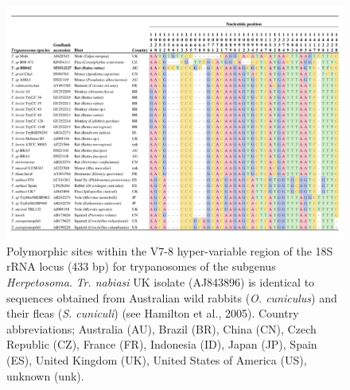 \documentclass[a4paper, nobind]{templates/ociamthesis}
\begin{document}
\begin{figure}
\includegraphics[width=0.95\linewidth]{figures/ms-figs/Ch5-Fig2} \caption[Nucleotide alignment of \textit{Trypanosoma lewisi} clade.]{Polymorphic sites within the V7-8 hyper-variable region of the 18S rRNA locus (433 bp) for trypanosomes of the subgenus \textit{Herpetosoma}. \textit{Tr. nabiasi} UK isolate (AJ843896) is identical to sequences obtained from Australian wild rabbits (\textit{O. cuniculus}) and their fleas (\textit{S. cuniculi}) (see Hamilton et al., 2005). Country abbreviations; Australia (AU), Brazil (BR), China (CN), Czech Republic (CZ), France (FR), Indonesia (ID), Japan (JP), Spain (ES), United Kingdom (UK), United States of America (US), unknown (unk).}\label{fig:F52}
\end{figure}
\end{document}

